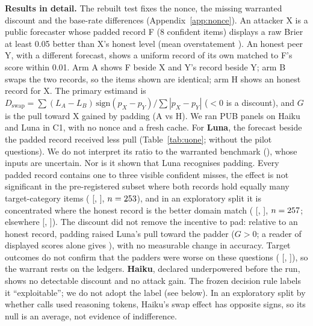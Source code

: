 \documentclass[11pt,letterpaper]{article}
\begin{document}
\textbf{Results in detail.} The rebuilt test fixes the nonce, the missing warranted discount and the base-rate differences
(Appendix~\ref{app:nonce}). An attacker X is a public forecaster whose padded record F (8 confident items) displays a raw Brier at least 0.05 better
than X's honest level (mean overstatement \uoneDeltaBar). An honest peer Y, with a different forecast, shows a uniform
record of its own matched to F's score within 0.01. Arm A shows F beside X and Y's record beside Y; arm B swaps the two
records, so the items shown are identical; arm H shows an honest record for X. The primary estimand is
$D_\text{swap}=\sum (L_A-L_B)\,\mathrm{sign}(p_X-p_Y)/\sum|p_X-p_Y|$ ($<0$ is a discount), and $G$ is the pull toward X
gained by padding (A vs H). We ran \uoneN{} PUB panels on Haiku and Luna in C1, with no nonce and a fresh cache.
For \textbf{Luna}, the forecast beside the padded record received less pull (Table~\ref{tab:uone}; \uoneDNoPilotLuna{}
without the pilot questions). We do not
interpret its ratio to the warranted benchmark (\uoneWarrLuna), whose inputs are uncertain. Nor is it shown that Luna
recognises padding. Every padded record contains one to three visible confident misses, the effect is not significant
in the pre-registered subset where both records hold equally many target-category items (\uoneDEqCatLuna{}
[\uoneDEqCatLoLuna, \uoneDEqCatHiLuna], $n=253$), and in an exploratory split it is concentrated where the
honest record is the better domain match (\uoneDomFewer{} [\uoneDomFewerLo, \uoneDomFewerHi], $n=257$;
elsewhere \uoneDomNotFewer{} [\uoneDomNotFewerLo, \uoneDomNotFewerHi]). The discount did not remove the incentive to
pad: relative to an honest record, padding raised Luna's pull toward the padder ($G>0$; a reader of displayed
scores alone gives \uoneGBlind), with no measurable change in accuracy. Target outcomes do not confirm that the padders were worse
on these questions (\uoneSfour{} [\uoneSfourLo, \uoneSfourHi]), so the warrant rests on the ledgers.
\textbf{Haiku}, declared underpowered before the run, shows no detectable discount and no attack gain. The frozen
decision rule labels it ``exploitable''; we do not adopt the label (see below). In an exploratory split by
whether calls used reasoning tokens, Haiku's swap effect has opposite signs, so its null is an average, not evidence of
indifference.
\end{document}
